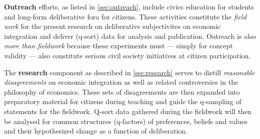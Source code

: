 \documentclass[11pt,a4paper,oneside,english]{article}
\begin{document}
\textbf{Outreach} efforts, as listed in \autoref{sec:outreach}, include civics education for students and long-form deliberative fora for citizens.
These activities constitute the \emph{field work} for the present research on deliberative subjectivites on economic integration and deliver (q-sort) data for analysis and publication.
Outreach is also \emph{more than fieldwork} because these experiments must --- simply for concept validity --- also constitute serious civil society initiatives at citizen participation.

The \textbf{research} component as described in \autoref{sec:research} serves to distill \emph{reasonable disagreements} on economic integration as well as related controversies in the philosophy of economics.
These sets of disagreements are then expanded into preparatory material for citizens during teaching and guide the q-sampling of statements for the fieldwork.
Q-sort data gathered during the fieldwork will then be analysed for common structures (q-factors) of preferences, beliefs and values and their hypothesized change as a function of deliberation.






\end{document}
